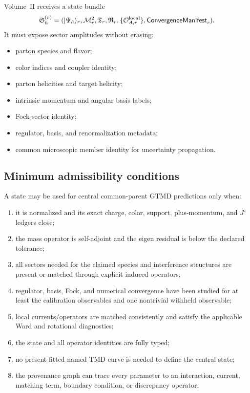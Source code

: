 \documentclass[11pt]{article}
\newcommand{\cO}{\mathcal O}
\newcommand{\cM}{\mathcal M}
\begin{document}
Volume~II receives a state bundle
\begin{equation}
 \mathfrak S_h^{(r)}=
 (|\Psi_h\rangle_r,\cM_r^2,
 \mathfrak T_r,\mathfrak R_r,
 \{\cO_{A,r}^{\rm local}\},
 \mathsf{ConvergenceManifest}_r).
\label{eq:state-bundle}
\end{equation}
It must expose sector amplitudes without erasing:
\begin{itemize}
\item parton species and flavor;
\item color indices and coupler identity;
\item parton helicities and target helicity;
\item intrinsic momentum and angular basis labels;
\item Fock-sector identity;
\item regulator, basis, and renormalization metadata;
\item common microscopic member identity for uncertainty propagation.
\end{itemize}

\subsection{Minimum admissibility conditions}

A state may be used for central common-parent GTMD predictions only when:
\begin{enumerate}
\item it is normalized and its exact charge, color, support, plus-momentum,
and \(J^z\) ledgers close;
\item the mass operator is self-adjoint and the eigen residual is below the
declared tolerance;
\item all sectors needed for the claimed species and interference structures
are present or matched through explicit induced operators;
\item regulator, basis, Fock, and numerical convergence have been studied for
at least the calibration observables and one nontrivial withheld observable;
\item local currents/operators are matched consistently and satisfy the
applicable Ward and rotational diagnostics;
\item the state and all operator identities are fully typed;
\item no present fitted named-TMD curve is needed to define the central state;
\item the provenance graph can trace every parameter to an interaction,
current, matching term, boundary condition, or discrepancy operator.
\end{enumerate}
\end{document}
